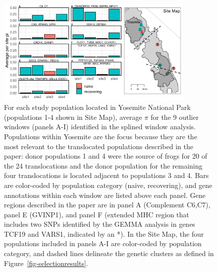 \documentclass[9pt,twoside,lineno]{pnas-new-SI}
\begin{document}
\begin{figure}

{\centering \includegraphics[width=0.85\textwidth]{figures/ave_pi_per_site_yose.png}

}

\caption{For each study population located in Yosemite National Park
(populations 1-4 shown in Site Map), average \(\pi\) for the 9 outlier
windows (panels A-I) identified in the splined window analysis.
Populations within Yosemite are the focus because they are the most
relevant to the translocated populations described in the paper: donor
populations 1 and 4 were the source of frogs for 20 of the 24
translocations and the donor population for the remaining four
translocations is located adjacent to populations 3 and 4. Bars are
color-coded by population category (naive, recovering), and gene
annotations within each window are listed above each panel. Gene regions
described in the paper are in panel A (Complement C6,C7), panel E
(GVINP1), and panel F (extended MHC region that includes two SNPs
identified by the GEMMA analysis in genes TCF19 and VARS1, indicated by
an *). In the Site Map, the four populations included in panels A-I are
color-coded by population category, and dashed lines delineate the
genetic clusters as defined in Figure~\ref{fig-selectionresults}.}

\end{figure}\clearpage

\newpage
\end{document}
